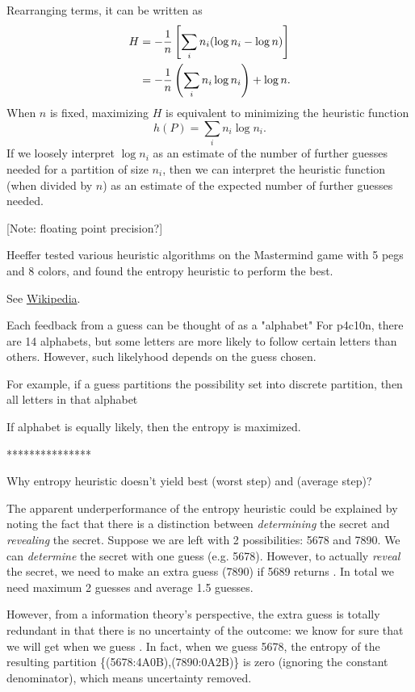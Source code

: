 Rearranging terms, it can be written as
\begin{align}
H 
&= - \frac{1}{n} \left[ \sum_i n_i (\log n_i - \log n ) \right] \notag \\
&= - \frac{1}{n} \left( \sum_i n_i \log n_i \right) + \log n . \notag
\end{align}
When $n$ is fixed, maximizing $H$ is equivalent to minimizing the heuristic function
\[
h(P) = \sum_i n_i \log n_i .
\]
If we loosely interpret $\log n_i$ as an estimate of the number of further guesses needed for a partition of size $n_i$, then we can interpret the heuristic function (when divided by $n$) as an estimate of the expected number of further guesses needed. 

[Note: floating point precision?]

Heeffer \cite{heeffer07} tested various heuristic algorithms on the Mastermind game with 5 pegs and 8 colors, and found the entropy heuristic to perform the best.

See \href{http://en.wikipedia.org/wiki/Entropy\_(information\_theory)\#Further\_properties}{Wikipedia}.

Each feedback from a guess can be thought of as a "alphabet"
For p4c10n, there are 14 alphabets, but some letters are more likely to follow certain letters than others. However, such likelyhood depends on the guess chosen.

For example, if a guess partitions the possibility set into discrete partition, then all letters in that alphabet 

If alphabet is equally likely, then the entropy is maximized.


***************

Why entropy heuristic doesn't yield best (worst step) and (average step)?

The apparent underperformance of the entropy heuristic could be explained by noting the fact that there is a distinction between \emph{determining} the secret and \emph{revealing} the secret. Suppose we are left with 2 possibilities: 5678 and 7890. We can \emph{determine} the secret with one guess (e.g. 5678). However, to actually \emph{reveal} the secret, we need to make an extra guess (7890) if 5689 returns . In total we need maximum 2 guesses and average 1.5 guesses.

However, from a information theory's perspective, the extra guess is totally redundant in that there is no uncertainty of the outcome: we know for sure that we will get  when we guess . In fact, when we guess 5678, the entropy of the resulting partition \{(5678:4A0B),(7890:0A2B)\} is zero (ignoring the constant denominator), which means uncertainty removed.

